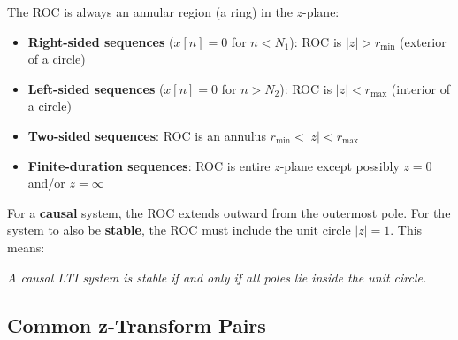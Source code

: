 The ROC is always an annular region (a ring) in the $z$-plane:
\begin{itemize}
    \item \textbf{Right-sided sequences} ($x[n] = 0$ for $n < N_1$): ROC is $|z| > r_{\min}$ (exterior of a circle)
    \item \textbf{Left-sided sequences} ($x[n] = 0$ for $n > N_2$): ROC is $|z| < r_{\max}$ (interior of a circle)
    \item \textbf{Two-sided sequences}: ROC is an annulus $r_{\min} < |z| < r_{\max}$
    \item \textbf{Finite-duration sequences}: ROC is entire $z$-plane except possibly $z = 0$ and/or $z = \infty$
\end{itemize}

\begin{keyconceptbox}[title=ROC and Causality/Stability]
For a \textbf{causal} system, the ROC extends outward from the outermost pole. For the system to also be \textbf{stable}, the ROC must include the unit circle $|z| = 1$. This means:
\begin{center}
\textit{A causal LTI system is stable if and only if all poles lie inside the unit circle.}
\end{center}
\end{keyconceptbox}



\subsection{Common z-Transform Pairs}

